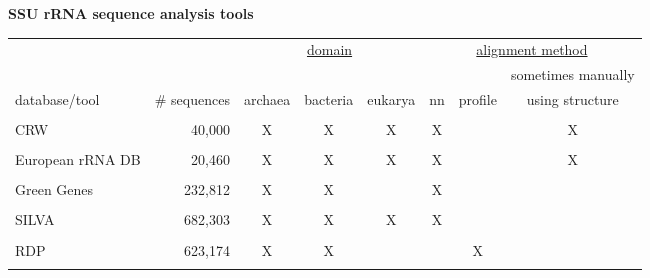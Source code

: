 \documentclass[landscape]{slides}
\begin{document}
\begin{slide}
\begin{center} 
\large
\textbf{SSU rRNA sequence analysis tools}
\end{center}
\medskip

\begin{center}
  \tiny
  \begin{tabular}{lr|ccc|ccc|} 
    & & \multicolumn{3}{|c|}{\underline{domain}} & \multicolumn{3}{|c|}{\underline{alignment method}} \\ 
    & & & & & & & sometimes manually \\
    database/tool & \# sequences & archaea & bacteria & eukarya & nn & profile & using structure \\ \hline
    & & & & & & & \\
    CRW & 40,000 & X & X & X & X & & X \\ 
    & & & & & & & \\
    European rRNA DB & 20,460 & X & X & X & X & & X \\ 
    & & & & & & & \\
    Green Genes & 232,812 & X & X & & X & & \\ 
    & & & & & & & \\
    SILVA & 682,303 & X & X & X & X &  & \\ %
    & & & & & & & \\
    RDP   & 623,174 & X & X & &   & X & \\ %
    & & & & & & & \\
  \end{tabular}
\end{center}


\vfill
\end{slide}
\end{document}
